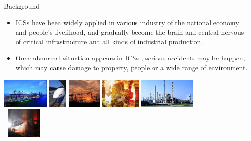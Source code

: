 \documentclass[10pt, compress]{beamer}
\begin{document}
\begin{frame}{Background}
    \begin{itemize}
      \item ICSs have been widely applied in various industry of the national economy and people's livelihood, and gradually become the brain and central nervous of critical infrastructure and all kinds of industrial production.
      \item Once abnormal situation appears in ICSs , serious accidents may be happen, which may cause damage to property, people or a wide range of environment.
    \end{itemize}

    \begin{center}
      \begin{minipage}[m]{0.9\textwidth}
        \includegraphics[height=1.5cm]{Figures/Introduction/Fig1.png} \hfill
        \includegraphics[height=1.5cm]{Figures/Introduction/Fig2.png} \hfill
        \includegraphics[height=1.5cm]{Figures/Introduction/Fig3.png} \hfill
        \includegraphics[height=1.5cm]{Figures/Introduction/Fig4.png} \hfill
        \includegraphics[height=1.5cm]{Figures/Introduction/Fig5.png} \vspace{1pt}\\
        \includegraphics[height=1.5cm, width = 2.2cm]{Figures/Introduction/Fig6.png} \hfill

\end{minipage}
\end{center}
\end{frame}
\end{document}
